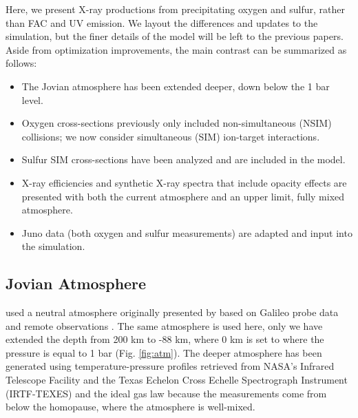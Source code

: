 \documentclass[draft]{agujournal2018}
\begin{document}
Here, we present X-ray productions from precipitating oxygen and sulfur, rather than FAC and UV emission.
We layout the differences and updates to the simulation, but the finer details of the model will be left to the previous papers.
Aside from optimization improvements, the main contrast can be summarized as follows:
\begin{itemize}
\item The Jovian atmosphere has been extended deeper, down below the 1 bar level.
\item Oxygen cross-sections previously only included non-simultaneous (NSIM) collisions; we now consider simultaneous (SIM) ion-target interactions.
\item Sulfur SIM cross-sections have been analyzed and are included in the model.
\item X-ray efficiencies and synthetic X-ray spectra that include opacity effects are presented with both the current atmosphere and an upper limit, fully mixed atmosphere.
\item Juno data (both oxygen and sulfur measurements) are adapted and input into the simulation.
\end{itemize}

\subsection{Jovian Atmosphere}
\label{sec:atm}

\citet{houston2018} used a neutral atmosphere originally presented by \citet{maurellis2001} based on Galileo probe data \citep{seiff1996,seiff1997} and remote observations \citep{sada1998}.
The same atmosphere is used here, only we have extended the depth from 200 km to -88 km, where 0 km is set to where the pressure is equal to 1 bar (Fig. \ref{fig:atm}).
The deeper atmosphere has been generated using temperature-pressure profiles retrieved from NASA's Infrared Telescope Facility and the Texas Echelon Cross Echelle Spectrograph Instrument (IRTF-TEXES) \citep{sinclair2018} and the ideal gas law because the measurements come from below the homopause, where the atmosphere is well-mixed.
\end{document}
